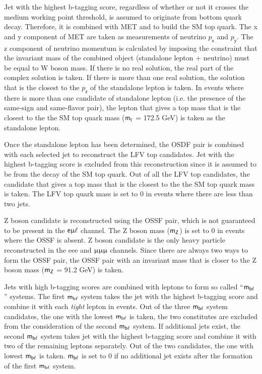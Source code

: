 Jet with the highest b-tagging score, regardless of whether or not it crosses the medium working point threshold, is assumed to originate from bottom quark decay. Therefore, it is combined with \ac{MET} and  to build the \ac{SM} top quark. The x and y component of \ac{MET} are taken as measurements of neutrino $p_{\textsf{x}}$ and $p_{\textsf{y}}$. The z component of neutrino momentum is calculated by imposing the constraint that the invariant mass of the combined object (standalone lepton + neutrino) must be equal to W boson mass. If there is no real solution, the real part of the complex solution is taken. If there is more than one real solution, the solution that is the closest to the $p_{\textsf{z}}$ of the standalone lepton is taken. In events where there is more than one candidate of standalone lepton (i.e. the presence of the same-sign and same-flavor pair), the lepton that gives a top mass that is the closest to the the \ac{SM} top quark mass ($\textsf{m}_{\textsf{t}}$ = 172.5 GeV) is taken as the standalone lepton.

Once the standalone lepton has been determined, the \ac{OSDF} pair is combined with each selected jet to reconstruct the LFV top candidates. Jet with the highest b-tagging score is excluded from this reconstruction since it is assumed to be from the decay of the \ac{SM} top quark. Out of all the LFV top candidates, the candidate that gives a top mass that is the closest to the the \ac{SM} top quark mass is taken. The LFV top quark mass is set to 0 in events where there are less than two jets.

Z boson candidate is reconstructed using the \ac{OSSF} pair, which is not guaranteed to be present in the $\textsf{e}\upmu\ell$ channel. The Z boson mass ($\textsf{m}_{\textsf{Z}}$) is set to 0 in events where the \ac{OSSF} is absent. Z boson candidate is the only heavy particle reconstructed in the eee and $\upmu\upmu\upmu$ channels. Since there are always two ways to form the \ac{OSSF} pair, the \ac{OSSF} pair with an invariant mass that is closer to the Z boson mass ($\textsf{m}_{\textsf{Z}}$ = 91.2 GeV) is taken. 

Jets with high b-tagging scores are combined with leptons to form so called ``$\textsf{m}_{\textsf{b}\ell}$'' systems. The first $\textsf{m}_{\textsf{b}\ell}$ system takes the jet with the highest b-tagging score and combine it with each \emph{tight} lepton in events. Out of the three $\textsf{m}_{\textsf{b}\ell}$ system candidates, the one with the lowest $\textsf{m}_{\textsf{b}\ell}$ is taken, the two constitutes are excluded from the consideration of the second $\textsf{m}_{\textsf{b}\ell}$ system. If additional jets exist, the second $\textsf{m}_{\textsf{b}\ell}$ system takes jet with the highest b-tagging score and combine it with two of the remaining leptons separately. Out of the two candidates, the one with lowest $\textsf{m}_{\textsf{b}\ell}$ is taken. $\textsf{m}_{\textsf{b}\ell}$ is set to 0 if no additional jet exists after the formation of the first $\textsf{m}_{\textsf{b}\ell}$ system.